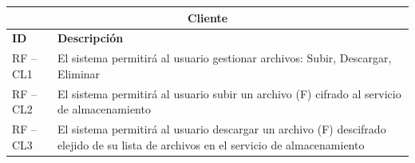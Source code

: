 \begin{table}[htb]
\centering
\begin{tabular}{| p{2cm} |  p{13.5cm} |}
\hline
\multicolumn{2}{|c|}{\textbf{Cliente}} \\ \hline
\textbf{ID} &  \textbf{Descripción} \\
\hline \hline
RF – CL1 & El sistema permitirá al usuario gestionar archivos: Subir, Descargar, Eliminar \\ \hline
RF – CL2 & El sistema permitirá al usuario subir un archivo (F) cifrado al servicio de almacenamiento  \\ \hline
RF – CL3 & El sistema permitirá al usuario descargar un archivo (F) descifrado elejido de su lista de archivos en el servicio de almacenamiento\\ \hline

\end{tabular}
\end{table}
